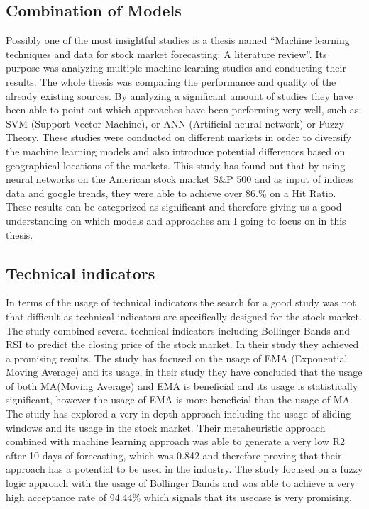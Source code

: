 \documentclass{imc-inf}
\begin{document}
	\subsection{Combination of Models}
	Possibly one of the most insightful studies is a thesis named “Machine learning techniques and data for stock market forecasting: A literature review”. \cite{lit_review} 
	Its purpose was analyzing multiple machine learning studies and conducting their results. The whole thesis was comparing the performance and quality 
	of the already existing sources. By analyzing a significant amount of studies they have been able to point out which approaches have been performing
	very well, such as: SVM (Support Vector Machine), or  ANN (Artificial neural network) \cite{Deep_learning_2} or Fuzzy Theory. These studies were conducted on different markets
	in order to diversify the machine learning models and also introduce potential differences based on geographical locations of the markets.
	This study has found out that by using neural networks on the American stock market  S\&P 500  and as input of indices data and google trends,
	they were able to achieve over 86.\% on a Hit Ratio. These results can be categorized as significant and therefore giving us a good understanding 
	on which models and approaches am I going to focus on in this thesis.
	
	\subsection{Technical indicators}
	In terms of the usage of technical indicators the search for a good study was not that difficult as technical indicators are specifically designed for the stock market.
	The study \cite{bollinger_rsi_combination} combined several technical indicators including Bollinger Bands and RSI to predict the closing price of the stock market. In their study
	they achieved a promising results. The study \cite{ma} has focused on the usage of EMA (Exponential Moving Average) and its usage, in their study they have concluded that
	the usage of both MA(Moving Average) and EMA is beneficial and its usage is statistically significant, however the usage of EMA is more beneficial than the usage of MA.
	The study \cite{sliding_windows} has explored a very in depth approach including the usage of sliding windows and its usage in the stock market. Their metaheuristic approach combined with 
	machine learning approach was able to generate a very low R2 after 10 days of forecasting, which was 0.842 and therefore proving that their approach has a potential to be used in the industry.
	The study \cite{bollinger} focused on a fuzzy logic approach with the usage of Bollinger Bands and was able to achieve a very high acceptance rate of 94.44\% which signals that its usecase is very promising.
	
\end{document}
